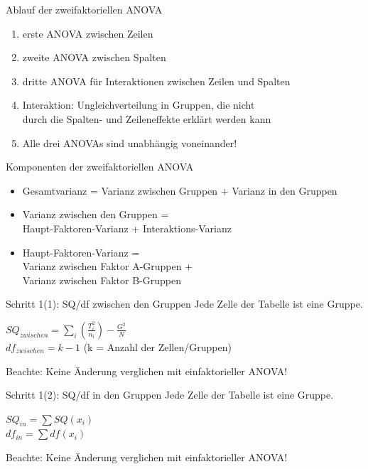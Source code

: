 \begin{frame}
  {Ablauf der zweifaktoriellen ANOVA}
  \begin{enumerate}[<+->]
    \item erste ANOVA zwischen Zeilen
    \item zweite ANOVA zwischen Spalten
    \item dritte ANOVA für \alert{Interaktionen} zwischen Zeilen und Spalten
    \Zeile
    \item Interaktion: Ungleichverteilung in Gruppen, die nicht\\
      durch die Spalten- und Zeileneffekte erklärt werden kann
    \Zeile
    \item Alle drei ANOVAs sind \alert{unabhängig} voneinander!
  \end{enumerate}
\end{frame}

\begin{frame}
  {Komponenten der zweifaktoriellen ANOVA}
  \begin{itemize}[<+->]
    \item \alert{Gesamtvarianz} = Varianz zwischen Gruppen + Varianz in den Gruppen
    \Zeile
    \item \alert{Varianz zwischen den Gruppen} =\\
      Haupt-Faktoren-Varianz + \alert{Interaktions-Varianz}
    \Zeile
    \item \alert{Haupt-Faktoren-Varianz} =\\
      Varianz zwischen Faktor A-Gruppen +\\
      Varianz zwischen Faktor B-Gruppen
  \end{itemize}
\end{frame}

\begin{frame}
  {Schritt 1(1): SQ\slash df zwischen den Gruppen}
  \alert{Jede Zelle} der Tabelle ist eine Gruppe.

  \begin{center}
    \alert{$SQ_{zwischen}=\sum\limits_i(\frac{T_i^2}{n_i})-\frac{G^2}{N}$}\\

    \alert{$df_{zwischen}=k-1$} (k = Anzahl der Zellen\slash Gruppen)
  \end{center}
  \vspace{1cm}
  Beachte: \alert{Keine} Änderung verglichen mit einfaktorieller ANOVA!
\end{frame}

\begin{frame}
  {Schritt 1(2): SQ\slash df in den Gruppen}
  \alert{Jede Zelle} der Tabelle ist eine Gruppe.

  \begin{center}
    \alert{$SQ_{in}=\sum SQ(x_i)$}\\

    \alert{$df_{in}=\sum df(x_i)$}
  \end{center}
  \vspace{1cm}
  Beachte: \alert{Keine} Änderung verglichen mit einfaktorieller ANOVA!
\end{frame}

